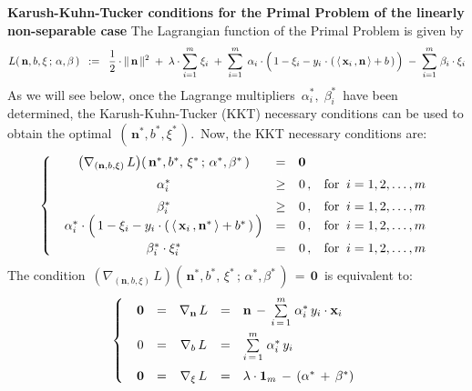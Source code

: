\vskip 0.5cm
\noindent
\textbf{Karush-Kuhn-Tucker conditions for the Primal Problem of the linearly non-separable case}
\vskip 0.1cm
\noindent
The Lagrangian function of the Primal Problem is given by
\begin{equation*}
L(\,\mathbf{n},b,\xi\,;\,\alpha,\beta\,)
\;\; := \;\;
	\dfrac{1}{2}\cdot\Vert\,\mathbf{n}\,\Vert^{2}
	\; + \;
	\lambda\cdot\overset{m}{\underset{i=1}{\sum}}\;\xi_{i}
	\; + \;
	\overset{m}{\underset{i = 1}{\sum}}\;\,
		\alpha_{i}
		\cdot
		\left(\,
			1 - \xi_{i}
			-
			y_{i}\overset{{\color{white}1}}{\cdot}\left(\,
				\langle\,\mathbf{x}_{i}\,,\mathbf{n}\,\rangle + b
				\,\right)
			\,\right)
	\; - \;
	\overset{m}{\underset{i = 1}{\sum}}\;
		\beta_{i}
		\cdot
		\xi_{i}
\end{equation*}
As we will see below, {\color{red}once the Lagrange multipliers \,$\alpha_{i}^{*},\; \beta_{i}^{*}$\,
have been determined, the Karush-Kuhn-Tucker (KKT) necessary conditions
can be used to obtain the optimal \,$(\,\mathbf{n}^{*},b^{*},\xi^{*}\,)$}.\,
Now, the KKT necessary conditions are:
\begin{equation*}
\left\{\;\;
	\begin{array}{cccc}
	\left(\nabla_{(\mathbf{n},b,\xi)}\,L\right)\!(\,\mathbf{n}^{*},b^{*},\,\xi^{*}\,;\,\alpha^{*},\beta^{*}\,) & = & \mathbf{0}\,{\color{white},}
	\\
	\alpha_{i}^{*} & \overset{{\color{white}1}}{\geq} & 0\,, & \textnormal{for}\;\; i = 1,2,\ldots,m
	\\
	\beta_{i}^{*} & \overset{{\color{white}1}}{\geq} & 0\,, & \textnormal{for}\;\; i = 1,2,\ldots,m
	\\
	\alpha_{i}^{*} \cdot \left(\,
		\overset{{\color{white}.}}{1} - \xi_{i} - y_{i}\cdot\left(\, \langle\,\mathbf{x}_{i}\,,\mathbf{n}^{*}\,\rangle + b^{*} \,\right)
		\,\right)
		& = & 0\,, & \textnormal{for}\;\; i = 1,2,\ldots,m
	\\
	\beta_{i}^{*} \cdot \xi_{i}^{*} & \overset{{\color{white}1}}{=} & 0\,, & \textnormal{for}\;\; i = 1,2,\ldots,m
	\end{array}
	\right.
\end{equation*}
The condition
\,$\left(\nabla_{(\mathbf{n},b,\xi)}\,L\right)\!(\,\mathbf{n}^{*},b^{*},\,\xi^{*}\,;\,\alpha^{*},\beta^{*}\,) \,=\, \mathbf{0}$\,
is equivalent to:
\begin{equation*}
\left\{\;\;
\begin{array}{ccccl}
\mathbf{0}
& = &
	\nabla_{\mathbf{n}}\,L
& = &
	\mathbf{n} \, - \, \overset{m}{\underset{i\,=\,1}{\sum}}\;\alpha_{i}^{*}\,y_{i}\cdot\mathbf{x}_{i}
\\
0
&=&
	\nabla_{b}\,L
& = &
	\overset{{\color{white}.}}{\overset{m}{\underset{i\,=\,1}{\sum}}\;\alpha_{i}^{*}\,y_{i}}
\\
\mathbf{0}
& = &
	\nabla_{\xi}\,L
& = &
	\overset{{\color{white}1}}{\lambda}\cdot\mathbf{1}_{m} \, - \, (\alpha^{*} \, + \, \beta^{*})
\end{array}
\right.
\end{equation*}
